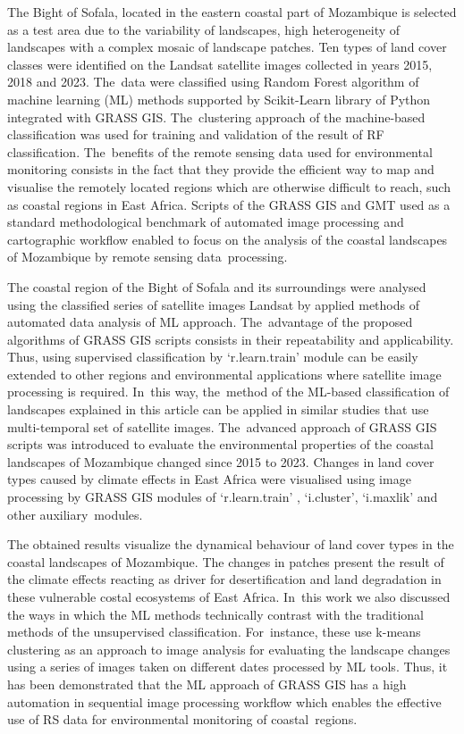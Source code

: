 \documentclass[coasts,article,accept,pdftex,oneauthor]{Definitions/mdpi}
\begin{document}
The Bight of Sofala, located in the eastern coastal part of Mozambique is {selected} as a test area {due to the variability of landscapes, high heterogeneity of landscapes with a complex mosaic of landscape patches}. Ten types of land cover classes were identified on the {Landsat satellite }images {collected in years 2015, 2018 and 2023. The~data were }classified using Random Forest algorithm of machine learning (ML) methods supported by Scikit-Learn library of Python integrated with GRASS GIS. The~clustering approach of the machine-based classification was used for training and validation of the result of RF classification. The~{benefits} of the{ }remote sensing data{ used }for environmental monitoring {consists in the fact} that {they} provide the efficient way to map and visualise the remotely located regions which are otherwise difficult to reach, such as coastal regions in East Africa. Scripts of the GRASS GIS and GMT used as a standard methodological benchmark of automated image processing and cartographic workflow enabled to focus on the analysis of the coastal landscapes of Mozambique by remote sensing data~processing. 

The coastal region of the Bight of Sofala and {its }surroundings were analysed {using} the classified series of {satellite }images {Landsat by applied methods of }automated data analysis of ML approach. The~{advantage of the }proposed algorithms of GRASS GIS scripts {consists in their repeatability and applicability. Thus, }using supervised classification by `r.learn.train' module can be easily extended to other regions and environmental applications where satellite image processing is required{. In~this way, the~method of the }ML-based classification of landscapes {explained in this article can be applied in similar studies that use} multi-temporal set of {satellite }images. The~advanced approach of GRASS GIS scripts was introduced to evaluate the environmental properties of the coastal landscapes of Mozambique changed since 2015 to 2023. Changes in land cover types caused by climate effects in East Africa were visualised using image processing by GRASS GIS modules of `r.learn.train' , `i.cluster', `i.maxlik' and other auxiliary~modules. 

The {obtained} results {visualize} the {dynamical }behaviour of land cover types in the coastal landscapes of Mozambique{. The} changes in patches {present the} result of the climate effects reacting as driver for desertification and land degradation in {these }vulnerable costal ecosystems {of East Africa}. In~this work we also discussed the ways in which the ML methods {technically }contrast with {the }traditional methods of {the }unsupervised classification{. For~instance, these use} k-means clustering {as an approach} to image analysis{ }for evaluating the landscape changes using a series of images taken on different dates {processed by ML tools}. Thus, {it has been demonstrated that }the ML approach of GRASS GIS{ has a }high automation in sequential image processing workflow which enables {the }effective use of RS data for environmental monitoring of coastal~regions.
\end{document}
